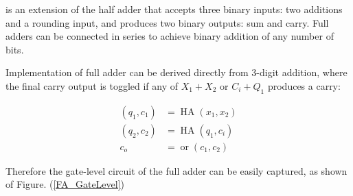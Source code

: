 is an extension of the half adder that accepts three binary inputs: two additions and a rounding input, and produces two binary outputs: sum and carry. Full adders can be connected in series to achieve binary addition of any number of bits.

Implementation of full adder can be derived directly from 3-digit addition, where the final carry output is toggled if any of \(X_1+X_2\) or \(C_i+Q_1\) produces a carry:

\begin{eqnarray}
	(q_1,c_1)&=\mathop{\mathrm{HA}}(x_1,x_2) \\
	(q_2,c_2)&=\mathop{\mathrm{HA}}(q_1,c_i) \\
	c_o &= \mathop{\mathrm{or}}(c_1,c_2)
\end{eqnarray}

Therefore the gate-level circuit of the full adder can be easily captured, as shown of Figure. (\ref{FA_GateLevel})
